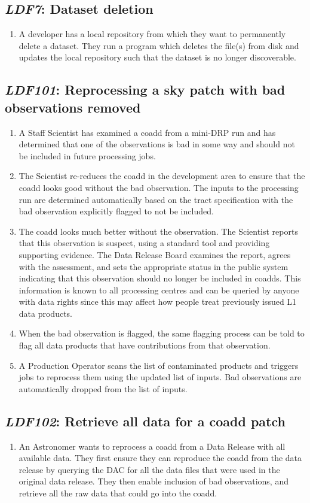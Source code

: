 \documentclass[DM,toc,lsstdraft]{lsstdoc}
\newcommand{\usecase}[3]{%
\subsection{\emph{#1}: #2}
\label{use:#1}
\begin{enumerate}[label=\alph*.]
#3
\end{enumerate}
}
\begin{document}
\usecase{LDF7}{Dataset deletion}{%

\item
A developer has a local repository from which they want to permanently delete a dataset.
They run a program which deletes the file(s) from disk and updates the local repository such that the dataset is no longer discoverable.

}

\usecase{LDF101}{Reprocessing a sky patch with bad observations removed}{%

\item
A Staff Scientist has examined a coadd from a mini-DRP run and has determined that one of the observations is bad in some way and should not be included in future processing jobs.

\item
The Scientist re-reduces the coadd in the development area to ensure that the coadd looks good without the bad observation.
The inputs to the processing run are determined automatically based on the tract specification with the bad observation explicitly flagged to not be included.

\item
The coadd looks much better without the observation.
The Scientist reports that this observation is suspect, using a standard tool and providing supporting evidence.
The Data Release Board examines the report, agrees with the assessment, and sets the appropriate status in the public system indicating that this observation should no longer be included in coadds.
This information is known to all processing centres and can be queried by anyone with data rights since this may affect how people treat previously issued L1 data products.

\item
When the bad observation is flagged, the same flagging process can be told
to flag all data products that have contributions from that observation.

\item
A Production Operator scans the list of contaminated products and triggers jobs to reprocess them using the updated list of inputs.
Bad observations are automatically dropped from the list of inputs.

}

\usecase{LDF102}{Retrieve all data for a coadd patch}{%

\item
An Astronomer wants to reprocess a coadd from a Data Release with all available data.
They first ensure they can reproduce the coadd from the data release by querying the DAC for all the data files that were used in the original data release.
They then enable inclusion of bad observations, and retrieve all the raw data that could go into the coadd.

}
\end{document}
